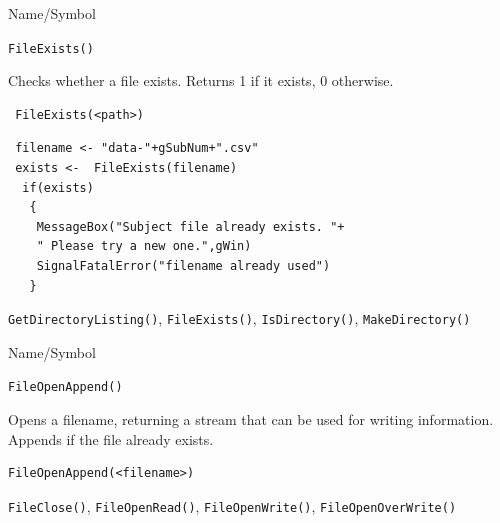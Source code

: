 \begin{desc}{Name/Symbol}
\item[Name/Symbol]	\verb+FileExists()+

\item[Description]	Checks whether a file exists.  Returns 1 if it exists, 0 otherwise.
\item[Usage]		
\begin{verbatim}
 FileExists(<path>)
\end{verbatim}

\item[Example]	
\begin{verbatim}
 filename <- "data-"+gSubNum+".csv"
 exists <-  FileExists(filename)
  if(exists)
   {
    MessageBox("Subject file already exists. "+
    " Please try a new one.",gWin) 
    SignalFatalError("filename already used")
   }
\end{verbatim}

\item[See Also]\verb+GetDirectoryListing()+, \verb+FileExists()+,       \verb+IsDirectory()+,        
   \verb+MakeDirectory()+      

\end{desc}




\begin{desc}{Name/Symbol}
\item[Name/Symbol]	\verb+FileOpenAppend()+

\item[Description] Opens a filename, returning a stream that can be
  used for writing information.  Appends if the file already exists.

\item[Usage]
\begin{verbatim}
FileOpenAppend(<filename>)
\end{verbatim}

\item[Example]	

\item[See Also]	\verb+FileClose()+, \verb+FileOpenRead()+, \verb+FileOpenWrite()+, 
\verb+FileOpenOverWrite()+
\end{desc}




